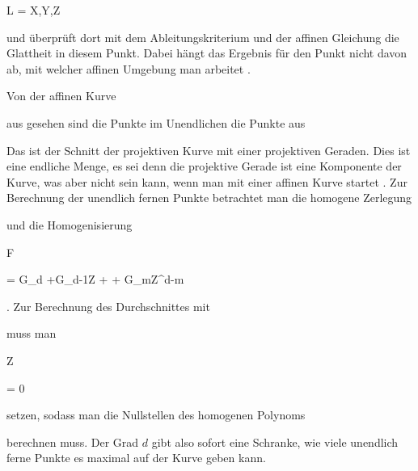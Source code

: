 {{ {L = X,Y,Z} {}

 {} {} {} {}} {} {}
und überprüft dort mit dem Ableitungskriterium und der affinen Gleichung die Glattheit in diesem Punkt. Dabei hängt das Ergebnis für den Punkt nicht davon ab, mit welcher affinen Umgebung man arbeitet
 {} {.}


Von der affinen Kurve

 aus gesehen sind die Punkte im Unendlichen die Punkte aus

 Das ist der Schnitt der projektiven Kurve mit einer projektiven Geraden. Dies ist eine endliche Menge, es sei denn die projektive Gerade ist eine Komponente der Kurve, was aber nicht sein kann, wenn man mit einer affinen Kurve startet
 {} {.}
Zur Berechnung der unendlich fernen Punkte betrachtet man die homogene Zerlegung


 {  }


und die Homogenisierung


\mavergleichskettedisp

{\vergleichskette

{ F
}

{ =} { G_d +G_{d-1}Z + \cdots + G_mZ^{d-m}
}

{ } {
}

{ } {
}

{ } {
}

}
{}{}{.}
Zur Berechnung des Durchschnittes mit

 muss man


\mavergleichskette

{\vergleichskette

{Z
}

{ = }{ 0
}

{  }{
}

{    }{
}

{   }{
}

}
{}{}{}
setzen, sodass man die Nullstellen des homogenen Polynoms

 {} {}
berechnen muss. Der Grad $d$ gibt also sofort eine Schranke, wie viele unendlich ferne Punkte es maximal auf der Kurve geben kann.


}




